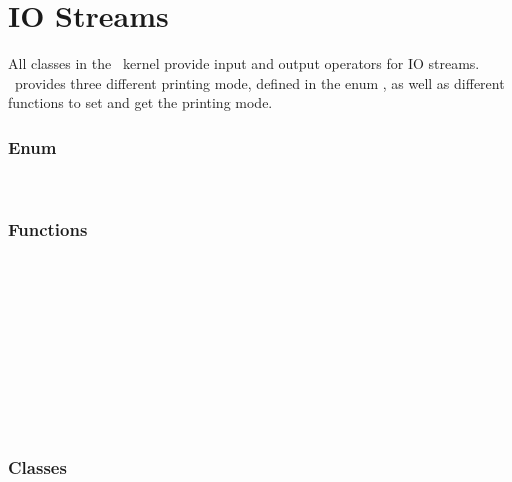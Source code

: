 
\chapter{IO Streams}

All classes in the \cgal\ kernel provide input and output operators for
IO streams.
\cgal\ provides three different printing mode, defined in the enum
, as well as different functions to set and get
the printing mode.

\subsection*{Enum}
 \\

\subsection*{Functions}
 \\
 \\
 \\
 \\
 \\
 \\
 \\
 \\
 \\

\subsection*{Classes}

\\
\\



